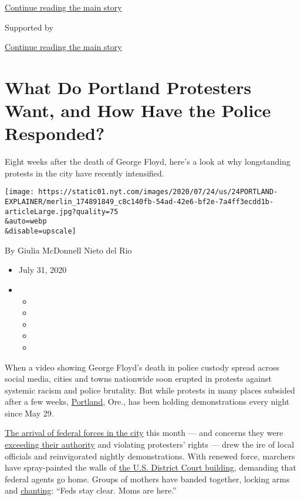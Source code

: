 \protect\hyperlink{after-top}{Continue reading the main story}

Supported by

\protect\hyperlink{after-sponsor}{Continue reading the main story}

\hypertarget{what-do-portland-protesters-want-and-how-have-the-police-responded}{%
\section{What Do Portland Protesters Want, and How Have the Police
Responded?}\label{what-do-portland-protesters-want-and-how-have-the-police-responded}}

Eight weeks after the death of George Floyd, here's a look at why
longstanding protests in the city have recently intensified.

\texttt{[image: https://static01.nyt.com/images/2020/07/24/us/24PORTLAND-EXPLAINER/merlin\_174891849\_c8c140fb-54ad-42e6-bf2e-7a4ff3ecdd1b-articleLarge.jpg?quality=75\\\&auto=webp\\\&disable=upscale]}

By Giulia McDonnell Nieto del Rio

\begin{itemize}
\item
  July 31, 2020
\item
  \begin{itemize}
  \item
  \item
  \item
  \item
  \item
  \end{itemize}
\end{itemize}

When a video showing George Floyd's death in police custody spread
across social media, cities and towns nationwide soon erupted in
protests against systemic racism and police brutality. But while
protests in many places subsided after a few weeks,
\href{https://www.nytimes.com/2020/07/28/us/portland-protests-fact-check.html}{Portland},
Ore., has been holding demonstrations every night since May 29.

\href{https://www.nytimes.com/2020/07/17/us/portland-protests.html}{The
arrival of federal forces in the city} this month --- and concerns they
were
\href{https://www.nytimes.com/2020/07/17/us/portland-protests.html}{exceeding
their authority} and violating protesters' rights --- drew the ire of
local officials and reinvigorated nightly demonstrations. With renewed
force, marchers have spray-painted the walls of
\href{https://www.nytimes.com/2020/07/22/us/portland-protests-courthouse.html}{the
U.S. District Court building}, demanding that federal agents go home.
Groups of mothers have banded together, locking arms and
\href{https://www.nytimes.com/2020/07/19/us/portland-protests.html}{chanting}:
``Feds stay clear. Moms are here.''

